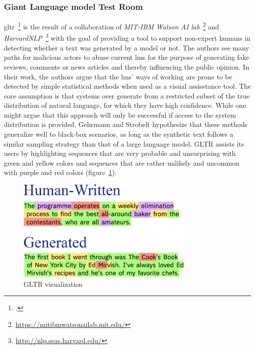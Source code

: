 \subsubsection{Giant Language model Test Room}
\label{sub:gltr}

\gls{gltr}~\footcite{DBLP:journals/corr/abs-1906-04043} is the result of a collaboration of \textit{MIT-IBM Watson AI lab}~\footnote{\url{https://mitibmwatsonailab.mit.edu/}} and \textit{HarvardNLP}~\footnote{\url{http://nlp.seas.harvard.edu/}} with the goal of providing a tool to support non-expert humans in detecting whether a text was generated by a model or not. The authors see many paths for malicious actors to abuse current \gls{lm}s for the purpose of generating fake reviews, comments or news articles and thereby influencing the public opinion. In their work, the authors argue that the \gls{lm}s' ways of working are prone to be detected by simple statistical methods when used as a visual assisstance tool. The core assumption is that systems over generate from a restricted subset of the true distribution of natural language, for which they have high confidence. While one might argue that this approach will only be successful if access to the system distribution is provided, Gehrmann and Strobelt hypothesize that these methods generalize well to black-box scenarios, as long as the synthetic text follows a similar sampling strategy than that of a large language model. GLTR assists its users by highlighting sequences that are very probable and unsurprising with green and yellow colors and sequences that are rather unlikely and uncommon with purple and red colors (figure~\ref{fig:gltr}).

\begin{figure}[h]
  	\includegraphics[height=5cm]{img/gltr}
  	\caption{GLTR visualization}
	\label{fig:gltr}
\end{figure}

